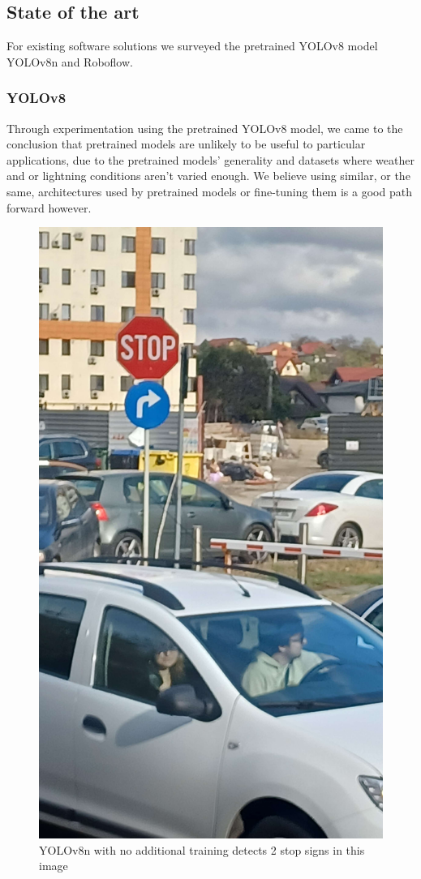 \documentclass[conference]{IEEEtran}
\begin{document}
\subsection{State of the art}

For existing software solutions we surveyed the pretrained YOLOv8 model YOLOv8n and Roboflow.

\subsubsection{YOLOv8}
Through experimentation using the pretrained YOLOv8 model, we came to the conclusion that pretrained
models are unlikely to be useful to particular applications, due to the pretrained models' generality
and datasets where weather and or lightning conditions aren't varied enough. We believe using similar,
or the same, architectures used by pretrained models or fine-tuning them is a good path forward however.

\begin{figure}[h!]
    \centerline{\includegraphics[width=0.5\linewidth,]{poza-fata-ac}}
    \caption{YOLOv8n with no additional training detects 2 stop signs in this image}
    \label{poza-fata-ac}
\end{figure}
\end{document}
